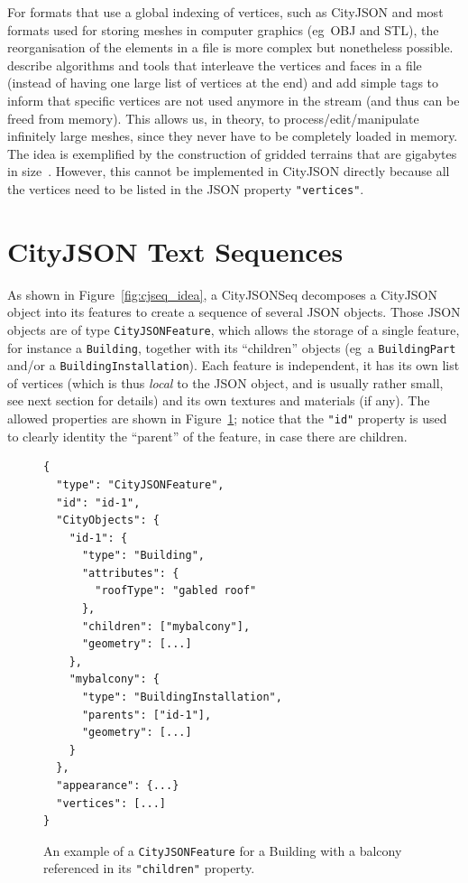 \documentclass[11pt,halfparskip,parskip=half]{scrartcl}
\newcommand{\eg}{eg}
\begin{document}
%

For formats that use a global indexing of vertices, such as CityJSON and most formats used for storing meshes in computer graphics (\eg\ OBJ and STL), the reorganisation of the elements in a file is more complex but nonetheless possible.
\citet{Isenburg03} describe algorithms and tools that interleave the vertices and faces in a file (instead of having one large list of vertices at the end) and add simple tags to inform that specific vertices are not used anymore in the stream (and thus can be freed from memory).
This allows us, in theory, to process/edit/manipulate infinitely large meshes, since they never have to be completely loaded in memory.
The idea is exemplified by the construction of gridded terrains that are gigabytes in size~\citep{Isenburg06-1}.
However, this cannot be implemented in CityJSON directly because all the vertices need to be listed in the JSON property \texttt{"vertices"}.


%
\section{CityJSON Text Sequences}%
\label{sec:cityjsonseq}


As shown in Figure~\ref{fig:cjseq_idea}, a CityJSONSeq decomposes a CityJSON object into its features to create a sequence of several JSON objects.
Those JSON objects are of type \texttt{CityJSONFeature}, which allows the storage of a single feature, for instance a \texttt{Building}, together with its ``children'' objects (\eg\ a \texttt{BuildingPart} and/or a \texttt{BuildingInstallation}).
Each feature is independent, it has its own list of vertices (which is thus \emph{local} to the JSON object, and is usually rather small, see next section for details) and its own textures and materials (if any).
The allowed properties are shown in Figure~\ref{fig:cjfeature}; notice that the \texttt{"id"} property is used to clearly identity the ``parent'' of the feature, in case there are children.
\begin{figure}
\begin{lstlisting}
{
  "type": "CityJSONFeature",
  "id": "id-1",
  "CityObjects": {
    "id-1": {
      "type": "Building",
      "attributes": {
        "roofType": "gabled roof"
      },
      "children": ["mybalcony"],
      "geometry": [...]
    },
    "mybalcony": {
      "type": "BuildingInstallation",
      "parents": ["id-1"],
      "geometry": [...]
    }
  },
  "appearance": {...}
  "vertices": [...]
}
\end{lstlisting}
\caption{An example of a \texttt{CityJSONFeature} for a Building with a balcony referenced in its \texttt{"children"} property.}%
\label{fig:cjfeature}
\end{figure}
\end{document}
